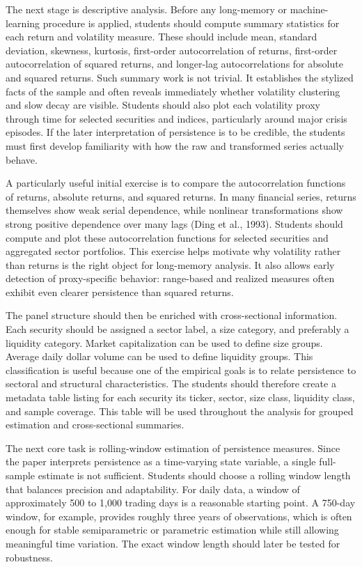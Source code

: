 \documentclass[12pt]{article}
\begin{document}
The next stage is descriptive analysis. Before any long-memory or machine-learning procedure is applied, students should compute summary statistics for each return and volatility measure. These should include mean, standard deviation, skewness, kurtosis, first-order autocorrelation of returns, first-order autocorrelation of squared returns, and longer-lag autocorrelations for absolute and squared returns. Such summary work is not trivial. It establishes the stylized facts of the sample and often reveals immediately whether volatility clustering and slow decay are visible. Students should also plot each volatility proxy through time for selected securities and indices, particularly around major crisis episodes. If the later interpretation of persistence is to be credible, the students must first develop familiarity with how the raw and transformed series actually behave.

A particularly useful initial exercise is to compare the autocorrelation functions of returns, absolute returns, and squared returns. In many financial series, returns themselves show weak serial dependence, while nonlinear transformations show strong positive dependence over many lags (Ding et al., 1993). Students should compute and plot these autocorrelation functions for selected securities and aggregated sector portfolios. This exercise helps motivate why volatility rather than returns is the right object for long-memory analysis. It also allows early detection of proxy-specific behavior: range-based and realized measures often exhibit even clearer persistence than squared returns.

The panel structure should then be enriched with cross-sectional information. Each security should be assigned a sector label, a size category, and preferably a liquidity category. Market capitalization can be used to define size groups. Average daily dollar volume can be used to define liquidity groups. This classification is useful because one of the empirical goals is to relate persistence to sectoral and structural characteristics. The students should therefore create a metadata table listing for each security its ticker, sector, size class, liquidity class, and sample coverage. This table will be used throughout the analysis for grouped estimation and cross-sectional summaries.

The next core task is rolling-window estimation of persistence measures. Since the paper interprets persistence as a time-varying state variable, a single full-sample estimate is not sufficient. Students should choose a rolling window length that balances precision and adaptability. For daily data, a window of approximately 500 to 1,000 trading days is a reasonable starting point. A 750-day window, for example, provides roughly three years of observations, which is often enough for stable semiparametric or parametric estimation while still allowing meaningful time variation. The exact window length should later be tested for robustness.
\end{document}
